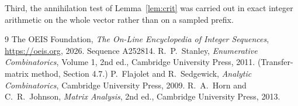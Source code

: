 \documentclass[11pt,a4paper]{article}
\theoremstyle{plain}
\theoremstyle{definition}
\begin{document}
Third, the annihilation test of Lemma~\ref{lem:crit} was carried out in exact integer
arithmetic on the whole vector rather than on a sampled prefix.

\begin{thebibliography}{9}
 The OEIS Foundation, \emph{The On-Line Encyclopedia of Integer
Sequences}, \url{https://oeis.org}, 2026. Sequence A252814.
 R.~P.~Stanley, \emph{Enumerative Combinatorics}, Volume 1, 2nd ed.,
Cambridge University Press, 2011. (Transfer-matrix method, Section 4.7.)
 P.~Flajolet and R.~Sedgewick, \emph{Analytic Combinatorics}, Cambridge
University Press, 2009.
 R.~A.~Horn and C.~R.~Johnson, \emph{Matrix Analysis}, 2nd ed., Cambridge
University Press, 2013.
\end{thebibliography}
\end{document}
